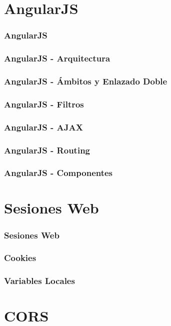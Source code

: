 \documentclass[a4paper,slidestop,xcolor=pst,blue]{beamer}
\begin{document}
\section{AngularJS}

\begin{frame}[c]
    \frametitle{AngularJS}
\end{frame}

\begin{frame}[c]
    \frametitle{AngularJS - Arquitectura}
\end{frame}

\begin{frame}[c]
    \frametitle{AngularJS - Ámbitos y Enlazado Doble}
\end{frame}

\begin{frame}[c]
    \frametitle{AngularJS - Filtros}
\end{frame}

\begin{frame}[c]
    \frametitle{AngularJS - AJAX}
\end{frame}

\begin{frame}[c]
    \frametitle{AngularJS - Routing}
\end{frame}

\begin{frame}[c]
    \frametitle{AngularJS - Componentes}
\end{frame}

\section{Sesiones Web}

\begin{frame}[c]
    \frametitle{Sesiones Web}
\end{frame}

\begin{frame}[c]
    \frametitle{Cookies}
\end{frame}

\begin{frame}[c]
    \frametitle{Variables Locales}
\end{frame}

\section{CORS}
\end{document}

